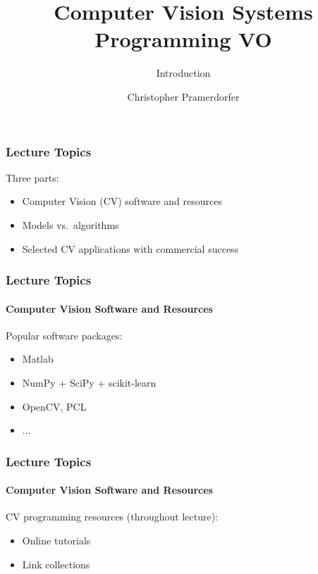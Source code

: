 \documentclass[xetex]{beamer}
\title{Computer Vision Systems Programming VO}
\subtitle{Introduction}
\author{Christopher Pramerdorfer}
\institute{Computer Vision Lab, Vienna University of Technology}
\begin{document}

\begin{frame}
\maketitle
\end{frame}


\begin{frame}
\frametitle{Lecture Topics}

Three parts:
\begin{itemize}
	\item Computer Vision (CV) software and resources
	\item Models vs.\ algorithms
	\item Selected CV applications with commercial success
\end{itemize}

\end{frame}


\begin{frame}
\frametitle{Lecture Topics}
\framesubtitle{Computer Vision Software and Resources}

Popular software packages:
\begin{itemize}
	\item Matlab
	\item NumPy + SciPy + scikit-learn
	\item OpenCV, PCL
	\item ...
\end{itemize}

\end{frame}


\begin{frame}
\frametitle{Lecture Topics}
\framesubtitle{Computer Vision Software and Resources}

CV programming resources (throughout lecture):
\begin{itemize}
	\item Online tutorials
	\item Link collections
\end{itemize}

\end{frame}
\end{document}
